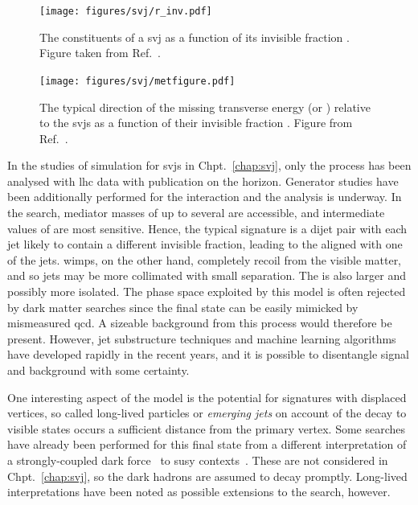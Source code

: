 \begin{figure}[htbp]
    \centering
    \texttt{[image: figures/svj/r\_inv.pdf]}
    \caption[The constituents of a semi-visible jet as a function of its invisible fraction]{The constituents of a \gls{svj} as a function of its invisible fraction \rinv. Figure taken from Ref.~.}
    \label{fig:theory_svj_rinv}
\end{figure}
    
\begin{figure}[htbp]
    \centering
    \texttt{[image: figures/svj/metfigure.pdf]}
    \caption[The typical direction of the missing transverse energy relative to the semi-visible jets as a function of the invisible fraction \rinv]{The typical direction of the missing transverse energy \ETslash\xspace (or \ptvecmiss) relative to the \glspl{svj} as a function of their invisible fraction \rinv. Figure from Ref.~.}
    \label{fig:theory_svj_met_dir}
\end{figure}

In the studies of simulation for \glspl{svj} in Chpt.~\ref{chap:svj}, only the \schannel process has been analysed with \acrshort{lhc} data with publication on the horizon. Generator studies have been additionally performed for the \tchannel interaction and the analysis is underway. In the \schannel search, mediator masses of up to several \TeVns are accessible, and intermediate values of \rinv are most sensitive. Hence, the typical signature is a dijet pair with each \gls{jet} likely to contain a different invisible fraction, leading to the \ptvecmiss aligned with one of the \glspl{jet}. \glspl{wimp}, on the other hand, completely recoil from the visible matter, and so \glspl{jet} may be more collimated with small separation. The \ptmiss is also larger and possibly more isolated. The phase space exploited by this model is often rejected by dark matter searches since the final state can be easily mimicked by mismeasured \acrshort{qcd}. A sizeable background from this process would therefore be present. However, \gls{jet} substructure techniques and machine learning algorithms have developed rapidly in the recent years, and it is possible to disentangle signal and background with some certainty.

One interesting aspect of the model is the potential for signatures with displaced vertices, so called long-lived particles or \emph{emerging jets} on account of the decay to visible states occurs a sufficient distance from the primary vertex. Some searches have already been performed for this final state from a different interpretation of a strongly-coupled dark force~\cite{Sirunyan:2018njd} to \acrlong{susy} contexts~\cite{SUS16038published}. These are not considered in Chpt.~\ref{chap:svj}, so the dark hadrons are assumed to decay promptly. Long-lived interpretations have been noted as possible extensions to the search, however.

